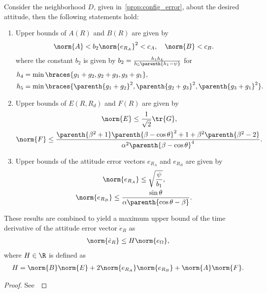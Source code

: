 \begin{prop}\label{prop:eR_dot_bound}
Consider the neighborhood \( D \), given in~\cref{prop:config_error}, about the desired attitude, then the following statements hold:
\begin{enumerate}
    \item \label{item:prop_eR_dot_bound_AB} Upper bounds of \( A(R) \) and \( B(R) \) are given by
        \begin{gather}
            \norm{A} < b_2 \norm{e_{R_A}}^2 < c_A  , \quad \norm{B} < c_B . \label{eqn:AB_bound}
        \end{gather}
        where the constant \( b_2\) is given by \( b_2 = \frac{h_1 h_4}{h_5 \parenth{h_1 - \psi}}\) for
        \begin{align*}
            h_4 &= \min\braces{g_1 + g_2, g_2 + g_3 , g_3 + g_1} ,\\
            h_5 &= \min\braces{\parenth{g_1 + g_2}^2,\parenth{g_2 + g_3}^2 , \parenth{g_3 + g_1}^2} .\\
        \end{align*}
    \item \label{item:prop_eR_dot_bound_EF} Upper bounds of \( E(R,R_d) \) and \( F(R) \) are given by
        \begin{gather}
            \norm{E} \leq \frac{1}{\sqrt{2}} \tr{G}  , \label{eqn:E_bound} \\
            \norm{F} \leq \frac{\parenth{\beta^2 + 1}\parenth{\beta - \cos \theta}^2 + 1 + \beta^2 \parenth{\beta^2-2}}{\alpha^2 \parenth{\beta-\cos \theta}^4} . \label{eqn:F_bound}
        \end{gather}
    \item Upper bounds of the attitude error vectors \( e_{R_A} \) and \( e_{R_B} \) are given by
        \begin{gather}
            \norm{e_{R_A}} \leq \sqrt{\frac{\psi}{b_1}}, \label{eqn:eRA_bound} \\
            \norm{e_{R_B}} \leq \frac{\sin\theta}{\alpha \parenth{\cos \theta - \beta}}. \label{eqn:eRB_bound}
        \end{gather}
\end{enumerate}
These results are combined to yield a maximum upper bound of the time derivative of the attitude error vector \( \dot{e}_R \) as
\begin{gather}
	\norm{\dot{e}_R} \leq H \norm{e_\Omega} ,\label{eqn:eR_bound}
\end{gather}
where  \( H \in \R \) is defined as
\begin{gather}
	H = \norm{B} \norm{E} + 2 \norm{e_{R_A}} \norm{e_{R_B}} + \norm{A}\norm{F}. \label{eqn:H}
\end{gather}
\end{prop}
\begin{proof}
See~
\end{proof}

